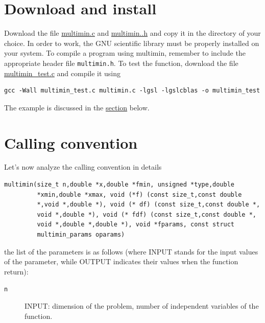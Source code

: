 \documentclass[11pt]{article}
\begin{document}
\section{Download and install}
\label{sec-2}


Download the file \href{file:///home/giulio/doc/org-webpage/software/multimin/multimin.c}{multimin.c} and \href{file:///home/giulio/doc/org-webpage/software/multimin/multimin.h}{multimin..h} and copy it in the
directory of your choice. In order to work, the GNU scientific library
must be properly installed on your system. To compile a program using
multimin, remember to include the appropriate header file
\texttt{multimin.h}. To test the function, download the file \href{file:///home/giulio/doc/org-webpage/software/multimin/multimin_test.c}{multimin\_test.c}
and compile it using
\begin{verbatim}
gcc -Wall multimin_test.c multimin.c -lgsl -lgslcblas -o multimin_test
\end{verbatim}
The example is discussed in the \hyperref[sec-4]{section} below.
\section{Calling convention}
\label{sec-3}


Let's now analyze the calling convention in details

\begin{verbatim}
multimin(size_t n,double *x,double *fmin, unsigned *type,double
         *xmin,double *xmax, void (*f) (const size_t,const double
         *,void *,double *), void (* df) (const size_t,const double *,
         void *,double *), void (* fdf) (const size_t,const double *,
         void *,double *,double *), void *fparams, const struct
         multimin_params oparams)
\end{verbatim}

the list of the parameters is as follows (where INPUT stands for the
input values of the parameter, while OUTPUT indicates their values
when the function return):


\begin{description}
\item[\texttt{n}] INPUT: dimension of the problem, number of independent
       variables of the function.
\end{description}
\end{document}
